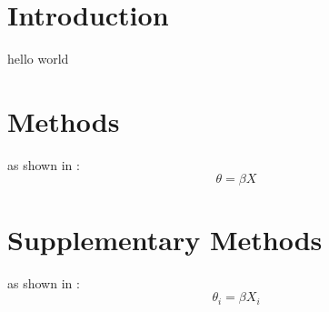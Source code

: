 \documentclass{ms}
\begin{document}
  \maketitle
  \section{Introduction}
  hello world
  \section{Methods}
  as shown in \cite{Last2001}:
  \begin{equation} \theta = \beta X \end{equation}
  \printbibliography
  \appendix
  \section{Supplementary Methods}
  as shown in \cite{Last2002}:
  \begin{equation} \theta_i = \beta X_i \end{equation}
  \printbibliography
\end{document}
